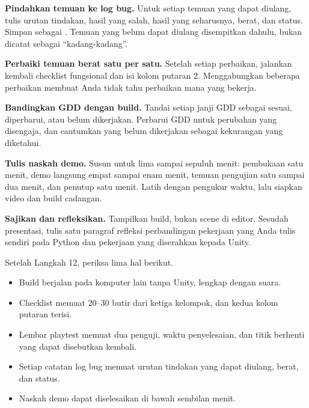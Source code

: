 \begin{langkah}
  \item \textbf{Pindahkan temuan ke log bug.} Untuk setiap temuan yang dapat
        diulang, tulis urutan tindakan, hasil yang salah, hasil yang
        seharusnya, berat, dan status. Simpan sebagai .
        Temuan yang belum dapat diulang disempitkan dahulu, bukan dicatat
        sebagai ``kadang-kadang''.

  \item \textbf{Perbaiki temuan berat satu per satu.} Setelah setiap
        perbaikan, jalankan kembali checklist fungsional dan isi kolom putaran
        2. Menggabungkan beberapa perbaikan membuat Anda tidak tahu perbaikan
        mana yang bekerja.

  \item \textbf{Bandingkan GDD dengan build.} Tandai setiap janji GDD sebagai
        sesuai, diperbarui, atau belum dikerjakan. Perbarui GDD untuk
        perubahan yang disengaja, dan cantumkan yang belum dikerjakan sebagai
        kekurangan yang diketahui.

  \item \textbf{Tulis naskah demo.} Susun  untuk lima
        sampai sepuluh menit: pembukaan satu menit, demo langsung empat sampai
        enam menit, temuan pengujian satu sampai dua menit, dan penutup satu
        menit. Latih dengan pengukur waktu, lalu siapkan video dan build
        cadangan.

  \item \textbf{Sajikan dan refleksikan.} Tampilkan build, bukan scene di
        editor. Sesudah presentasi, tulis satu paragraf refleksi perbandingan
        pekerjaan yang Anda tulis sendiri pada Python dan pekerjaan yang
        diserahkan kepada Unity.
\end{langkah}

\begin{ujibox}
Setelah Langkah 12, periksa lima hal berikut.
\begin{itemize}[leftmargin=1.4em, itemsep=0.2em]
  \item Build berjalan pada komputer lain tanpa Unity, lengkap dengan suara.
  \item Checklist memuat 20--30 butir dari ketiga kelompok, dan kedua kolom
        putaran terisi.
  \item Lembar playtest memuat dua penguji, waktu penyelesaian, dan titik
        berhenti yang dapat disebutkan kembali.
  \item Setiap catatan log bug memuat urutan tindakan yang dapat diulang,
        berat, dan status.
  \item Naskah demo dapat diselesaikan di bawah sembilan menit.
\end{itemize}
\end{ujibox}

